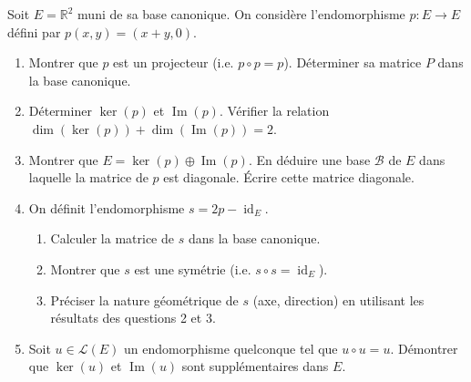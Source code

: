 \documentclass[11pt]{article}
\begin{document}
\begin{exercice}
Soit $E = \mathbb{R}^2$ muni de sa base canonique. On considère l'endomorphisme $p : E \to E$ défini par $p(x, y) = (x+y, 0)$.
\begin{enumerate}
    \item Montrer que $p$ est un projecteur (i.e. $p \circ p = p$). Déterminer sa matrice $P$ dans la base canonique.
    \item Déterminer $\ker(p)$ et $\operatorname{Im}(p)$. Vérifier la relation $\dim(\ker(p)) + \dim(\operatorname{Im}(p)) = 2$.
    \item Montrer que $E = \ker(p) \oplus \operatorname{Im}(p)$. En déduire une base $\mathcal{B}$ de $E$ dans laquelle la matrice de $p$ est diagonale. Écrire cette matrice diagonale.
    \item On définit l'endomorphisme $s = 2p - \operatorname{id}_E$. 
    \begin{enumerate}
        \item Calculer la matrice de $s$ dans la base canonique. 
        \item Montrer que $s$ est une symétrie (i.e. $s \circ s = \operatorname{id}_E$). 
        \item Préciser la nature géométrique de $s$ (axe, direction) en utilisant les résultats des questions 2 et 3.
    \end{enumerate}
    \item Soit $u \in \mathcal{L}(E)$ un endomorphisme quelconque tel que $u \circ u = u$. Démontrer que $\ker(u)$ et $\operatorname{Im}(u)$ sont supplémentaires dans $E$.
\end{enumerate}
\end{exercice}
\end{document}

